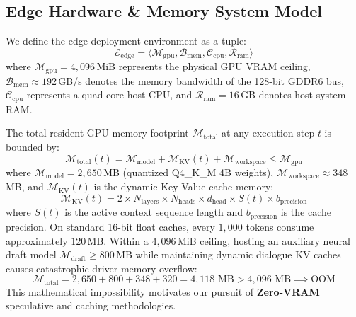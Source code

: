 \documentclass[10pt,journal,compsoc]{IEEEtran}
\begin{document}
\subsection{Edge Hardware \& Memory System Model}
We define the edge deployment environment as a tuple:
\begin{equation}
    \mathcal{E}_{\text{edge}} = \langle \mathcal{M}_{\text{gpu}}, \mathcal{B}_{\text{mem}}, \mathcal{C}_{\text{cpu}}, \mathcal{R}_{\text{ram}} \rangle
\end{equation}
where $\mathcal{M}_{\text{gpu}} = 4{,}096$\,MiB represents the physical GPU VRAM ceiling, $\mathcal{B}_{\text{mem}} \approx 192$\,GB/s denotes the memory bandwidth of the 128-bit GDDR6 bus, $\mathcal{C}_{\text{cpu}}$ represents a quad-core host CPU, and $\mathcal{R}_{\text{ram}} = 16$\,GB denotes host system RAM.

The total resident GPU memory footprint $\mathcal{M}_{\text{total}}$ at any execution step $t$ is bounded by:
\begin{equation}
    \mathcal{M}_{\text{total}}(t) = \mathcal{M}_{\text{model}} + \mathcal{M}_{\text{KV}}(t) + \mathcal{M}_{\text{workspace}} \le \mathcal{M}_{\text{gpu}}
\end{equation}
where $\mathcal{M}_{\text{model}} = 2{,}650$\,MB (quantized Q4\_K\_M 4B weights), $\mathcal{M}_{\text{workspace}} \approx 348$\,MB, and $\mathcal{M}_{\text{KV}}(t)$ is the dynamic Key-Value cache memory:
\begin{equation}
    \mathcal{M}_{\text{KV}}(t) = 2 \times N_{\text{layers}} \times N_{\text{heads}} \times d_{\text{head}} \times S(t) \times b_{\text{precision}}
\end{equation}
where $S(t)$ is the active context sequence length and $b_{\text{precision}}$ is the cache precision. On standard 16-bit float caches, every $1{,}000$ tokens consume approximately $120$\,MB. Within a $4{,}096$\,MiB ceiling, hosting an auxiliary neural draft model $\mathcal{M}_{\text{draft}} \ge 800$\,MB while maintaining dynamic dialogue
KV caches causes catastrophic driver memory overflow:
\begin{equation}
    \mathcal{M}_{\text{total}} = 2{,}650 + 800 + 348 + 320 = 4{,}118\text{ MB} > 4{,}096\text{ MB} \implies \text{OOM}
\end{equation}
This mathematical impossibility motivates our pursuit of \textbf{Zero-VRAM} speculative and caching methodologies.
\end{document}
